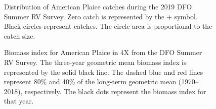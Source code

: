 \documentclass[11pt]{book}
\begin{document}
\begin{figure}[htb]

{\centering {} 

}

\caption{Distribution of American Plaice catches during the 2019 DFO Summer RV Survey. Zero catch is represented by the + symbol. Black circles represent catches. The circle area is proportional to the catch size.}\label{fig:50-map-aplaice}
\end{figure}

\begin{figure}[htb]

{\centering {} 

}

\caption{Biomass index for American Plaice in 4X from the DFO Summer RV Survey. The three-year geometric mean biomass index is represented by the solid black line. The dashed blue and red lines represent 80\% and 40\% of the long-term geometric mean (1970--2018), respectively. The black dots represent the biomass index for that year.}\label{fig:51-fig-aplaice-biomass4X}
\end{figure}
\end{document}

